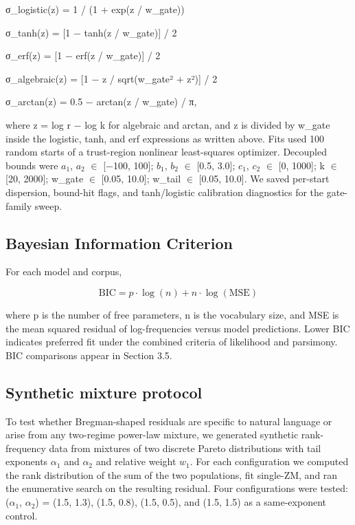 \documentclass[11pt]{article}
\begin{document}
σ\_logistic(z) = 1 / (1 + exp(z / w\_gate))

σ\_tanh(z) = [1 − tanh(z / w\_gate)] / 2

σ\_erf(z) = [1 − erf(z / w\_gate)] / 2

σ\_algebraic(z) = [1 − z / sqrt(w\_gate² + z²)] / 2

σ\_arctan(z) = 0.5 − arctan(z / w\_gate) / π,

where z = log r − log k for algebraic and arctan, and z is divided by w\_gate inside the logistic, tanh, and erf expressions as written above. Fits used 100 random starts of a trust-region nonlinear least-squares optimizer. Decoupled bounds were $a_1$, $a_2$ $\in$ [−100, 100]; $b_1$, $b_2$ $\in$ [0.5, 3.0]; $c_1$, $c_2$ $\in$ [0, 1000]; k $\in$ [20, 2000]; w\_gate $\in$ [0.05, 10.0]; w\_tail $\in$ [0.05, 10.0]. We saved per-start dispersion, bound-hit flags, and tanh/logistic calibration diagnostics for the gate-family sweep.

\subsection{Bayesian Information Criterion}

For each model and corpus,

\begin{equation}
\tag{10}\label{eq:bic}
\mathrm{BIC} = p \cdot \log(n) + n \cdot \log(\mathrm{MSE})
\end{equation}

where p is the number of free parameters, n is the vocabulary size, and MSE is the mean squared residual of log-frequencies versus model predictions. Lower BIC indicates preferred fit under the combined criteria of likelihood and parsimony. BIC comparisons appear in Section 3.5.

\subsection{Synthetic mixture protocol}

To test whether Bregman-shaped residuals are specific to natural language or arise from any two-regime power-law mixture, we generated synthetic rank-frequency data from mixtures of two discrete Pareto distributions with tail exponents $\alpha_1$ and $\alpha_2$ and relative weight $w_1$. For each configuration we computed the rank distribution of the sum of the two populations, fit single-ZM, and ran the enumerative search on the resulting residual. Four configurations were tested: ($\alpha_1$, $\alpha_2$) = (1.5, 1.3), (1.5, 0.8), (1.5, 0.5), and (1.5, 1.5) as a same-exponent control.
\end{document}
